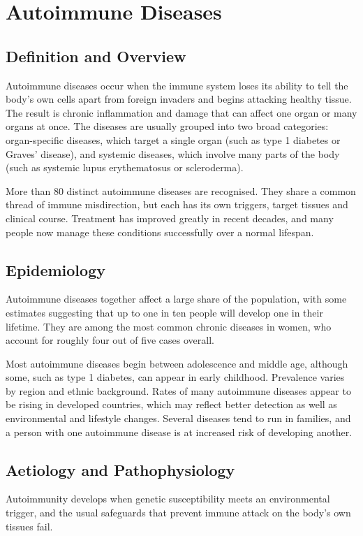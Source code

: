 \chapter{Autoimmune Diseases}

\section*{Definition and Overview}
Autoimmune diseases occur when the immune system loses its ability to tell the body's own cells apart from foreign invaders and begins attacking healthy tissue. The result is chronic inflammation and damage that can affect one organ or many organs at once. The diseases are usually grouped into two broad categories: organ-specific diseases, which target a single organ (such as type 1 diabetes or Graves' disease), and systemic diseases, which involve many parts of the body (such as systemic lupus erythematosus or scleroderma).

More than 80 distinct autoimmune diseases are recognised. They share a common thread of immune misdirection, but each has its own triggers, target tissues and clinical course. Treatment has improved greatly in recent decades, and many people now manage these conditions successfully over a normal lifespan.

\section*{Epidemiology}
Autoimmune diseases together affect a large share of the population, with some estimates suggesting that up to one in ten people will develop one in their lifetime. They are among the most common chronic diseases in women, who account for roughly four out of five cases overall.

Most autoimmune diseases begin between adolescence and middle age, although some, such as type 1 diabetes, can appear in early childhood. Prevalence varies by region and ethnic background. Rates of many autoimmune diseases appear to be rising in developed countries, which may reflect better detection as well as environmental and lifestyle changes. Several diseases tend to run in families, and a person with one autoimmune disease is at increased risk of developing another.

\section*{Aetiology and Pathophysiology}
Autoimmunity develops when genetic susceptibility meets an environmental trigger, and the usual safeguards that prevent immune attack on the body's own tissues fail.

